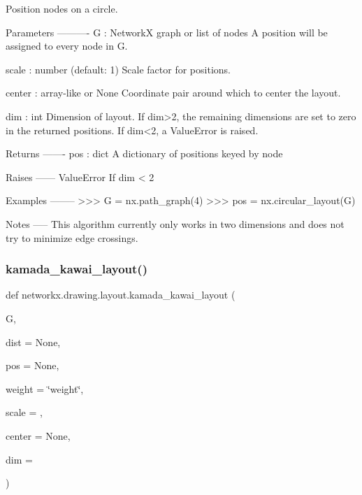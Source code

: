 \begin{DoxyVerb}Position nodes on a circle.

Parameters
----------
G : NetworkX graph or list of nodes
    A position will be assigned to every node in G.

scale : number (default: 1)
    Scale factor for positions.

center : array-like or None
    Coordinate pair around which to center the layout.

dim : int
    Dimension of layout.
    If dim>2, the remaining dimensions are set to zero
    in the returned positions.
    If dim<2, a ValueError is raised.

Returns
-------
pos : dict
    A dictionary of positions keyed by node

Raises
------
ValueError
    If dim < 2

Examples
--------
>>> G = nx.path_graph(4)
>>> pos = nx.circular_layout(G)

Notes
-----
This algorithm currently only works in two dimensions and does not
try to minimize edge crossings.\end{DoxyVerb}
 \mbox{\label{namespacenetworkx_1_1drawing_1_1layout_a6ab42bac0264130fda591b926dc36600}} 
\subsubsection{\texorpdfstring{kamada\+\_\+kawai\+\_\+layout()}{kamada\_kawai\_layout()}}
{\footnotesize\ttfamily def networkx.\+drawing.\+layout.\+kamada\+\_\+kawai\+\_\+layout (\begin{DoxyParamCaption}\item[{}]{G,  }\item[{}]{dist = {\ttfamily None},  }\item[{}]{pos = {\ttfamily None},  }\item[{}]{weight = {\ttfamily \char`\"{}weight\char`\"{}},  }\item[{}]{scale = {},  }\item[{}]{center = {\ttfamily None},  }\item[{}]{dim = {} }\end{DoxyParamCaption})}

